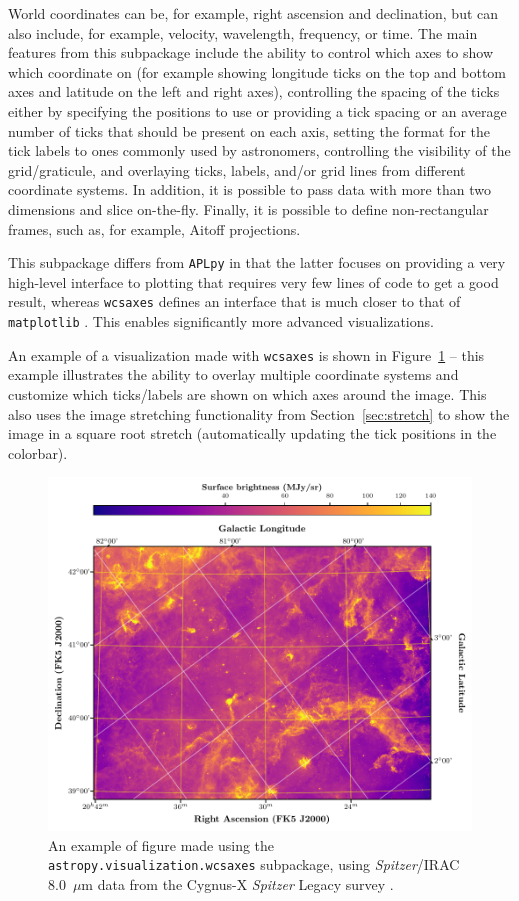 \documentclass[modern]{aastex61}
\newcommand{\package}[1]{\texttt{#1}\xspace}
\newcommand{\sectionname}{Section\xspace}
\renewcommand{\figurename}{Figure\xspace}
\begin{document}
World coordinates can be, for example, right ascension and declination, but can also include, for example, velocity, wavelength, frequency, or time. The main features from this subpackage include the ability to control which axes to show which coordinate on (for example showing longitude ticks on the top and bottom axes and latitude on the left and right axes), controlling the spacing of the ticks either by specifying the positions to use or providing a tick spacing or an average number of ticks that should be present on each axis, setting the format for the tick labels to ones commonly used by astronomers, controlling the visibility of the grid/graticule, and overlaying ticks, labels, and/or grid lines from different coordinate systems. In addition, it is possible to pass data with more than two dimensions and slice on-the-fly. Finally, it is possible to define non-rectangular frames, such as, for example, Aitoff projections.

This subpackage differs from \package{APLpy} \citep{aplpy} in that the latter focuses on providing a very high-level interface to plotting that requires very few lines of code to get a good result, whereas \package{wcsaxes} defines an interface that is much closer to that of \package{matplotlib} \citep{matplotlib}. This enables significantly more advanced visualizations.

An example of a visualization made with \package{wcsaxes} is shown in \figurename~\ref{fig:wcsaxes} -- this example illustrates the ability to overlay multiple coordinate systems and customize which ticks/labels are shown on which axes around the image. This also uses the image stretching functionality from \sectionname~\ref{sec:stretch} to show the image in a square root stretch (automatically updating the tick positions in the colorbar).

\begin{figure}
\includegraphics[width=\textwidth]{cygnus_x_spitzer.pdf}
\caption{%
An example of figure made using the \package{astropy.visualization.wcsaxes} subpackage, using \textit{Spitzer}/IRAC 8.0~$\mu$m data from the Cygnus-X \textit{Spitzer} Legacy survey \citep{cygnusx}.
\label{fig:wcsaxes}
}
\end{figure}
\end{document}
